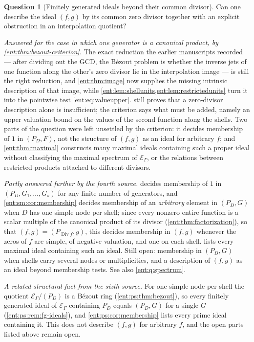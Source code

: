 \documentclass[11pt]{article}
\theoremstyle{plain}
\theoremstyle{plain}
\theoremstyle{plain}
\theoremstyle{definition}
\theoremstyle{definition}
\theoremstyle{definition}
\theoremstyle{definition}
\newtheorem{question}[question]{Question}
\theoremstyle{remark}
\newcommand{\E}{\mathcal E_\Gamma}
\DeclareMathOperator{\Div}{Div}\DeclareMathOperator{\inpol}{in}
\begin{document}
\begin{question}[Finitely generated ideals beyond their common divisor]
\label{ent:q:ideals}
Can one describe the ideal $(f,g)$ by its common zero divisor together with
an explicit obstruction in an interpolation quotient?
\end{question}
\emph{Answered for the case in which one generator is a canonical product,
by \cref{ent:thm:bezout-criterion}.} The exact reduction the earlier
manuscripts recorded --- after dividing out the GCD, the B\'ezout problem is
whether the inverse jets of one function along the other's zero divisor lie
in the interpolation image --- is still the right reduction, and
\cref{ent:thm:image} now supplies the missing intrinsic description of that
image, while \cref{ent:lem:shellunits,ent:lem:restrictedunits} turn it into
the pointwise test \eqref{ent:eq:valueupper}.  still
proves that a zero-divisor description alone is insufficient; the criterion
says what must be added, namely an upper valuation bound on the values of the
second function along the shells. Two parts of the question were left
unsettled by the criterion: it decides membership of $1$ in $(P_D,F)$, not
the structure of $(f,g)$ as an ideal for arbitrary $f$; and
\cref{ent:thm:maximal} constructs many maximal ideals containing such a
proper ideal without classifying the maximal spectrum of $\E$, or the
relations between restricted products attached to different divisors.

\emph{Partly answered further by the fourth source.}
 decides membership of $1$ in
$(P_D,G_1,\ldots,G_s)$ for any finite number of generators, and
\cref{ent:sm:cor:membership} decides membership of an \emph{arbitrary}
element in $(P_D,G)$ when $D$ has one simple node per shell; since every
nonzero entire function is a scalar multiple of the canonical product of its
divisor (\cref{ent:thm:factorization}), so that $(f,g)=(P_{\Div f},g)$, this
decides membership in $(f,g)$ whenever the zeros of $f$ are simple, of
negative valuation, and one on each shell.
 lists every maximal ideal containing such an
ideal. Still open: membership in $(P_D,G)$ when shells carry several nodes or
multiplicities, and a description of $(f,g)$ as an ideal beyond membership
tests. See also \cref{ent:q:spectrum}.

\emph{A related structural fact from the sixth source.} For one simple node
per shell the quotient $\E/(P_D)$ is a B\'ezout ring
(\cref{ent:ps:thm:bezout}), so every finitely generated ideal of $\E$
containing $P_D$ equals $(P_D,G)$ for a single $G$
(\cref{ent:ps:rem:fg-ideals}), and \cref{ent:ps:cor:membership} lists every
prime ideal containing it. This does not describe $(f,g)$ for arbitrary $f$,
and the open parts listed above remain open.
\end{document}
